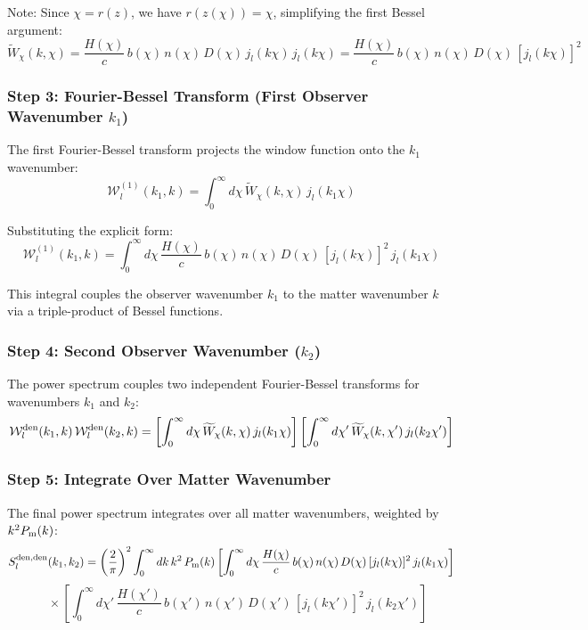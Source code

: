 Note: Since $\chi = r(z)$, we have $r(z(\chi)) = \chi$, simplifying the first Bessel argument:
\begin{equation}
\widetilde{W}_\chi(k, \chi) = \frac{H(\chi)}{c} \, b(\chi) \, n(\chi) \, D(\chi) \, j_l(k \chi) \, j_l(k \chi) = \frac{H(\chi)}{c} \, b(\chi) \, n(\chi) \, D(\chi) \, [j_l(k \chi)]^2
\end{equation}

\subsubsection{Step 3: Fourier-Bessel Transform (First Observer Wavenumber $k_1$)}

The first Fourier-Bessel transform projects the window function onto the $k_1$ wavenumber:
\begin{equation}
\mathcal{W}_l^{(1)}(k_1, k) = \int_0^\infty d\chi \, \widetilde{W}_\chi(k, \chi) \, j_l(k_1 \chi)
\end{equation}

Substituting the explicit form:
\begin{equation}
\label{eq:step3_den_den}
\mathcal{W}_l^{(1)}(k_1, k) = \int_0^\infty d\chi \, \frac{H(\chi)}{c} \, b(\chi) \, n(\chi) \, D(\chi) \, [j_l(k \chi)]^2 \, j_l(k_1 \chi)
\end{equation}

This integral couples the observer wavenumber $k_1$ to the matter wavenumber $k$ via a triple-product of Bessel functions.

\subsubsection{Step 4: Second Observer Wavenumber ($k_2$)}

The power spectrum couples two independent Fourier-Bessel transforms for wavenumbers $k_1$ and $k_2$:
\begin{equation}
\mathcal{W}_l^{\rm den}(k_1, k) \, \mathcal{W}_l^{\rm den}(k_2, k) = \left[\int_0^\infty d\chi \, \widetilde{W}_\chi(k, \chi) \, j_l(k_1 \chi)\right] \left[\int_0^\infty d\chi' \, \widetilde{W}_\chi(k, \chi') \, j_l(k_2 \chi')\right]
\end{equation}

\subsubsection{Step 5: Integrate Over Matter Wavenumber}

The final power spectrum integrates over all matter wavenumbers, weighted by $k^2 P_{\rm m}(k)$:
\begin{equation}
\label{eq:final_den_den_explicit}
S_l^{\rm den,den}(k_1, k_2) = \left(\frac{2}{\pi}\right)^2 \int_0^\infty dk \, k^2 \, P_{\rm m}(k) \left[\int_0^\infty d\chi \, \frac{H(\chi)}{c} \, b(\chi) \, n(\chi) \, D(\chi) \, [j_l(k \chi)]^2 \, j_l(k_1 \chi)\right]
\end{equation}
\begin{equation}
\quad \times \left[\int_0^\infty d\chi' \, \frac{H(\chi')}{c} \, b(\chi') \, n(\chi') \, D(\chi') \, [j_l(k \chi')]^2 \, j_l(k_2 \chi')\right]
\end{equation}

